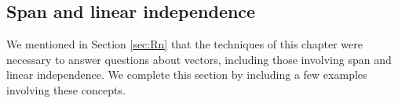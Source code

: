 \subsection*{Span and linear independence}
We mentioned in Section \ref{sec:Rn} that the techniques of this chapter were necessary to answer questions about vectors, including those involving span and linear independence. We complete this section by including a few examples involving these concepts.

\medskip

